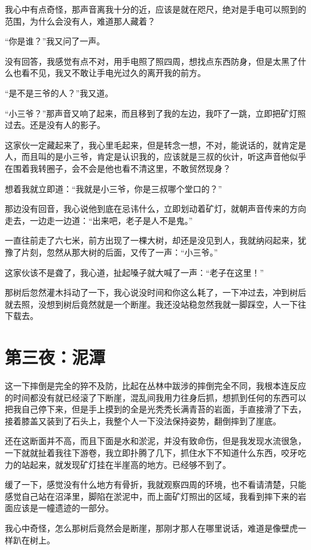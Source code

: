 我心中有点奇怪，那声音离我十分的近，应该是就在咫尺，绝对是手电可以照到的范围，为什么会没有人，难道那人藏着？

“你是谁？”我又问了一声。

没有回答，我感觉有点不对，用手电照了照四周，想找点东西防身，但是太黑了什么也看不见，我又不敢让手电光过久的离开我的前方。

“是不是三爷的人？”我又道。

“小三爷？”那声音又响了起来，而且移到了我的左边，我吓了一跳，立即把矿灯照过去。还是没有人的影子。

这家伙一定藏起来了，我心里毛起来，但是转念一想，不对，能说话的，就肯定是人，而且叫的是小三爷，肯定是认识我的，应该就是三叔的伙计，听这声音他似乎在围着我转圈子，会不会是他也看不清这里，不敢贸然现身？

想着我就立即道：“我就是小三爷，你是三叔哪个堂口的？”

那边没有回音，我心说他到底在忌讳什么，立即划动着矿灯，就朝声音传来的方向走去，一边走一边道：“出来吧，老子是人不是鬼。”

一直往前走了六七米，前方出现了一棵大树，却还是没见到人，我就纳闷起来，犹豫了片刻，忽然从那大树的后面，又传了一声：“小三爷。”

这家伙该不是聋了，我心道，扯起嗓子就大喊了一声：“老子在这里！”

那树后忽然灌木抖动了一下，我心说没时间和你这么耗了，一下冲过去，冲到树后就去照，没想到树后竟然就是一个断崖。我还没站稳忽然我就一脚踩空，人一下往下载去。

\chapter{第三夜：泥潭}

这一下摔倒是完全的猝不及防，比起在丛林中跋涉的摔倒完全不同，我根本连反应的时间都没有就已经滚了下断崖，混乱间我用力往身后抓，想抓到任何的东西可以把我自己停下来，但是手上摸到的全是光秃秃长满青苔的岩面，手直接滑了下去，接着膝盖又装到了石头上，我整个人一下没法保持姿势，翻倒摔到了崖底。

还在这断面并不高，而且下面是水和淤泥，并没有致命伤，但是我发现水流很急，一下就就扯着我往下游卷，我立即扑腾了几下，抓住水下不知道什么东西，咬牙吃力的站起来，就发现矿灯挂在半崖高的地方。已经够不到了。

缓了一下，感觉没有什么地方有骨折，我就观察四周的环境，也不看请清楚，只能感觉自己站在沼泽里，脚陷在淤泥中，而上面矿灯照出的区域，我看到摔下来的岩面应该是一幢遗迹的一部分。

我心中奇怪，怎么那树后竟然会是断崖，那刚才那人在哪里说话，难道是像壁虎一样趴在树上。

